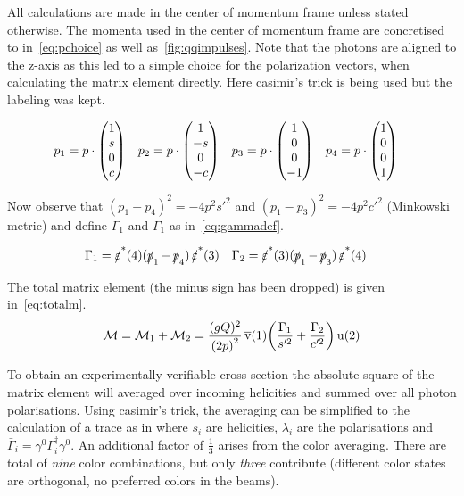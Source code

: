 All calculations are made in the center of momentum frame unless
stated otherwise.  The momenta used in the center of momentum frame
are concretised to in~\eqref{eq:pchoice} as well
as~\ref{fig:qqimpulses}.  Note that the photons are aligned to the
z-axis as this led to a simple choice for the polarization vectors,
when calculating the matrix element directly. Here casimir's trick is
being used but the labeling was kept.


\begin{align}
  \label{eq:pchoice}
  p_1&=p\cdot\mqty(1 \\ s \\ 0 \\ c)
     & p_2&=p\cdot\mqty(1 \\ -s \\ 0 \\ -c)
     & p_3&=p\cdot\mqty(1 \\ 0 \\ 0 \\ -1)
     & p_4&=p\cdot\mqty(1 \\ 0 \\ 0 \\ 1)
\end{align}

Now observe that \((p_1-p_4)^2=-4p^2s'^2\) and
\((p_1-p_3)^2=-4p^2c'^2\) (Minkowski metric) and define \(\Gamma_1\)
and \(\Gamma_1\) as in~\eqref{eq:gammadef}.

\begin{align}
  \label{eq:gammadef}
  \Gamma_1 &= \pses(4)(\ps_1 - \ps_4)\pses(3) &
  \Gamma_2 &= \pses(3)(\ps_1 - \ps_3)\pses(4)
\end{align}

The total matrix element (the minus sign has been dropped) is given in~\eqref{eq:totalm}.
\begin{equation}
  \label{eq:totalm}
  \mathcal{M} = \mathcal{M}_1 + \mathcal{M}_2 = \frac{(gQ)^2}{\qty(2p)^2}\operatorname*{\overline{v}}(1)\qty(\frac{\Gamma_1}{s'^2}+\frac{\Gamma_2}{c'^2})\operatorname{u}(2)
\end{equation}

To obtain an experimentally verifiable cross section the absolute
square of the matrix element will averaged over incoming helicities
and summed over all photon polarisations.  Using casimir's trick, the
averaging can be simplified to the calculation of a trace as in where
\(s_i\) are helicities, \(\lambda_i\) are the polarisations and
\(\bar{\Gamma}_i=\gamma^0\Gamma^\dagger_i\gamma^0\). An additional
factor of \(\frac{1}{3}\) arises from the color averaging. There are
total of \emph{nine} color combinations, but only \emph{three}
contribute (different color states are orthogonal, no preferred colors
in the beams).

